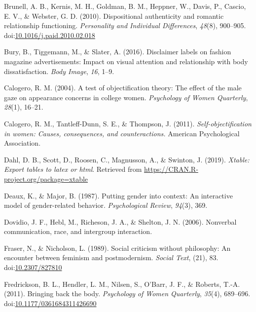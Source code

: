 \documentclass[
  man]{apa6}
\begin{document}
\leavevmode\hypertarget{ref-brunelletal2010}{}%
Brunell, A. B., Kernis, M. H., Goldman, B. M., Heppner, W., Davis, P., Cascio, E. V., \& Webster, G. D. (2010). Dispositional authenticity and romantic relationship functioning. \emph{Personality and Individual Differences}, \emph{48}(8), 900--905. doi:\href{https://doi.org/10.1016/j.paid.2010.02.018}{10.1016/j.paid.2010.02.018}

\leavevmode\hypertarget{ref-bury2016}{}%
Bury, B., Tiggemann, M., \& Slater, A. (2016). Disclaimer labels on fashion magazine advertisements: Impact on visual attention and relationship with body dissatisfaction. \emph{Body Image}, \emph{16}, 1--9.

\leavevmode\hypertarget{ref-calogero2004test}{}%
Calogero, R. M. (2004). A test of objectification theory: The effect of the male gaze on appearance concerns in college women. \emph{Psychology of Women Quarterly}, \emph{28}(1), 16--21.

\leavevmode\hypertarget{ref-calogero2011}{}%
Calogero, R. M., Tantleff-Dunn, S. E., \& Thompson, J. (2011). \emph{Self-objectification in women: Causes, consequences, and counteractions.} American Psychological Association.

\leavevmode\hypertarget{ref-R-xtable}{}%
Dahl, D. B., Scott, D., Roosen, C., Magnusson, A., \& Swinton, J. (2019). \emph{Xtable: Export tables to latex or html}. Retrieved from \url{https://CRAN.R-project.org/package=xtable}

\leavevmode\hypertarget{ref-deaux1987putting}{}%
Deaux, K., \& Major, B. (1987). Putting gender into context: An interactive model of gender-related behavior. \emph{Psychological Review}, \emph{94}(3), 369.

\leavevmode\hypertarget{ref-dovidio2006nonverbal}{}%
Dovidio, J. F., Hebl, M., Richeson, J. A., \& Shelton, J. N. (2006). Nonverbal communication, race, and intergroup interaction.

\leavevmode\hypertarget{ref-frasernicholson1989}{}%
Fraser, N., \& Nicholson, L. (1989). Social criticism without philosophy: An encounter between feminism and postmodernism. \emph{Social Text}, (21), 83. doi:\href{https://doi.org/10.2307/827810}{10.2307/827810}

\leavevmode\hypertarget{ref-fredricksonetal2011}{}%
Fredrickson, B. L., Hendler, L. M., Nilsen, S., O'Barr, J. F., \& Roberts, T.-A. (2011). Bringing back the body. \emph{Psychology of Women Quarterly}, \emph{35}(4), 689--696. doi:\href{https://doi.org/10.1177/0361684311426690}{10.1177/0361684311426690}
\end{document}
